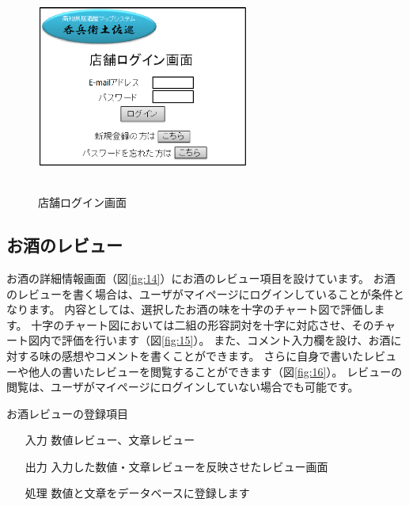 \documentclass[a4j,titlepage]{jarticle}
\begin{document}
\begin{figure}[htbp]
  \begin{center}
  \includegraphics [height=7cm, width=7cm]{extrnal1_design_document_image/s5.eps}
  \caption{店舗ログイン画面}
  \label {fig:s5}
  \end{center}
\end{figure}

\newpage
\subsection{お酒のレビュー}
お酒の詳細情報画面（図\ref{fig:14}）にお酒のレビュー項目を設けています。
お酒のレビューを書く場合は、ユーザがマイページにログインしていることが条件となります。
内容としては、選択したお酒の味を十字のチャート図で評価します。
十字のチャート図においては二組の形容詞対を十字に対応させ、そのチャート図内で評価を行います（図\ref{fig:15}）。
また、コメント入力欄を設け、お酒に対する味の感想やコメントを書くことができます。
さらに自身で書いたレビューや他人の書いたレビューを閲覧することができます（図\ref{fig:16}）。
レビューの閲覧は、ユーザがマイページにログインしていない場合でも可能です。

お酒レビューの登録項目
\begin{enumerate}
  \item [入力] 数値レビュー、文章レビュー
  \item [出力] 入力した数値・文章レビューを反映させたレビュー画面
  \item [処理] 数値と文章をデータベースに登録します
\end{enumerate}
\end{document}
